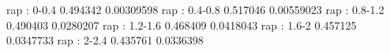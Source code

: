 rap : 0-0.4
0.494342 0.00309598
rap : 0.4-0.8
0.517046 0.00559023
rap : 0.8-1.2
0.490403 0.0280207
rap : 1.2-1.6
0.468409 0.0418043
rap : 1.6-2
0.457125 0.0347733
rap : 2-2.4
0.435761 0.0336398
